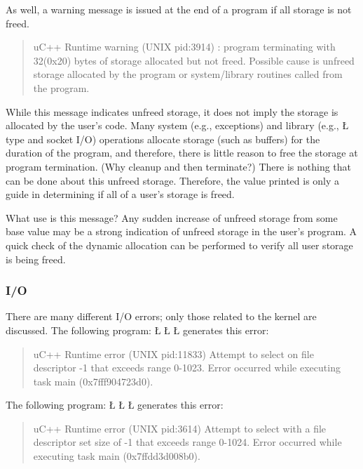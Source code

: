 \documentclass[openright,twoside]{report}
\begin{document}
As well, a warning message is issued at the end of a program if all storage is not freed.
\begin{quote}
\BGfont
uC++ Runtime warning (UNIX pid:3914) : program terminating with 32(0x20) bytes of storage allocated but not freed.
Possible cause is unfreed storage allocated by the program or system/library routines called from the program.
\end{quote}
While this message indicates unfreed storage, it does not imply the storage is allocated by the user's code.
Many system (e.g., exceptions) and library (e.g., \LGinlinetrue\LGbegin\lgrinde\L{}\endlgrinde\LGend{} type and socket I/O) operations allocate storage (such as buffers) for the duration of the program, and therefore, there is little reason to free the storage at program termination.
(Why cleanup and then terminate?)
There is nothing that can be done about this unfreed storage.
Therefore, the value printed is only a guide in determining if all of a user's storage is freed.

What use is this message?
Any sudden increase of unfreed storage from some base value may be a strong indication of unfreed storage in the user's program.
A quick check of the dynamic allocation can be performed to verify all user storage is being freed.


\subsubsection{I/O}

There are many different I/O errors;
only those related to the \uC kernel are discussed.
The following program:
\LGinlinefalse\LGbegin\lgrinde
\L{}
\L{\LB{}}
\L{\LB{\}}}
\endlgrinde\LGend
generates this error:
\begin{quote}
\BGfont
uC++ Runtime error (UNIX pid:11833) Attempt to select on file descriptor -1 that exceeds range 0-1023.
Error occurred while executing task main (0x7fff904723d0).
\end{quote}

The following program:
\LGinlinefalse\LGbegin\lgrinde
\L{}
\L{\LB{}}
\L{\LB{\}}}
\endlgrinde\LGend
generates this error:
\begin{quote}
\BGfont
uC++ Runtime error (UNIX pid:3614) Attempt to select with a file descriptor set size of -1 that exceeds range 0-1024.
Error occurred while executing task main (0x7ffdd3d008b0).
\end{quote}
\end{document}
